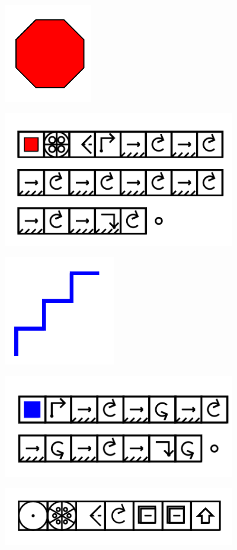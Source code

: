 \documentclass[11pt]{article}
\begin{document}
\includegraphics{image33.png}

\includegraphics[width=4in]{image34.png}

\includegraphics{image35.png}

\includegraphics[width=4in]{image36.png}








\includegraphics[width=4in]{image37.png}
\end{document}
